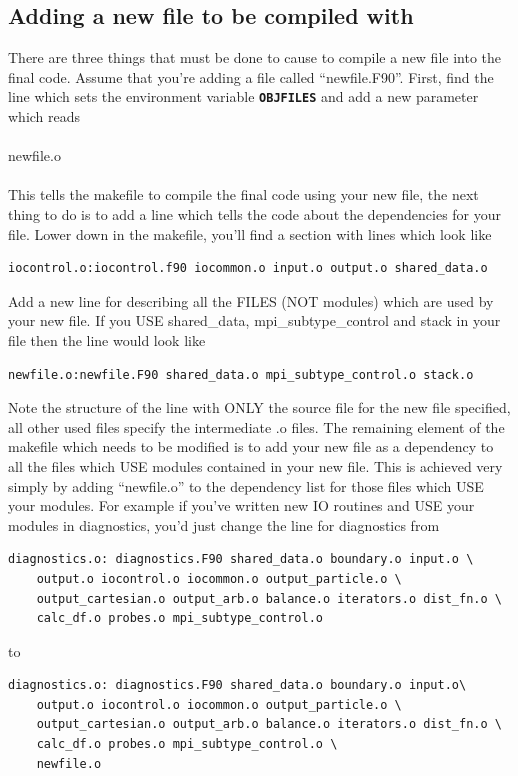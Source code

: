 \documentclass[12pt,a4paper]{article}
\newcommand{\simpleboxverbatim}{\begin{Verbatim}[obeytabs=true,frame=single,
  framerule=0.5mm,rulecolor=\color{warwickmid},formatcom=\color{black}]}
\newcommand{\inlinecode}[1]{{\color{warwickred} \bf\texttt{#1}}}
\newcommand{\EPOCH}{{\color{warwickdark}\fontfamily{phv}\selectfont{EPOCH}}}
\begin{document}
\subsection{Adding a new file to be compiled with {\EPOCH}}
There are three things that must be done to cause {\EPOCH} to compile a new file
into the final code. Assume that you're adding a file called
``newfile.F90''. First, find the line which sets the environment variable
\inlinecode{OBJFILES} and add a new parameter which reads\\
\\
newfile.o\\
\\ This tells the makefile to compile the final code using your new file, the
next thing to do is to add a line which tells the code about the dependencies
for your file. Lower down in the makefile, you'll find a section with lines
which look like
\simpleboxverbatim
iocontrol.o:iocontrol.f90 iocommon.o input.o output.o shared_data.o
\end{Verbatim}
Add a new line for describing all the FILES (NOT modules) which are used by
your new file. If you USE shared\_data, mpi\_subtype\_control and stack in
your file then the line would look like
\simpleboxverbatim
newfile.o:newfile.F90 shared_data.o mpi_subtype_control.o stack.o
\end{Verbatim}
Note the structure of the line with ONLY the source file for the new file
specified, all other used files specify the intermediate .o files. The
remaining element of the makefile which needs to be modified is to add your
new file as a dependency to all the files which USE modules contained in your
new file. This is achieved very simply by adding ``newfile.o'' to the dependency
list for those files which USE your modules. For example if you've written new
IO routines and USE your modules in diagnostics, you'd just change the line
for diagnostics from

\simpleboxverbatim
diagnostics.o: diagnostics.F90 shared_data.o boundary.o input.o \
	output.o iocontrol.o iocommon.o output_particle.o \
	output_cartesian.o output_arb.o balance.o iterators.o dist_fn.o \
	calc_df.o probes.o mpi_subtype_control.o
\end{Verbatim}
to
\simpleboxverbatim
diagnostics.o: diagnostics.F90 shared_data.o boundary.o input.o\
	output.o iocontrol.o iocommon.o output_particle.o \
	output_cartesian.o output_arb.o balance.o iterators.o dist_fn.o \
	calc_df.o probes.o mpi_subtype_control.o \
	newfile.o
\end{Verbatim}
\end{document}
